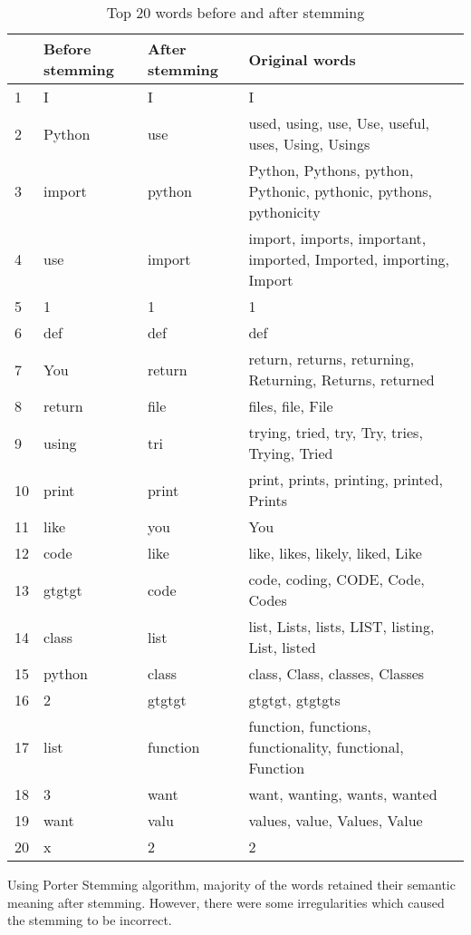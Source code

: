 \begin{table}
\caption{Top 20 words before and after stemming}\label{stem}
\begin{tabu}{X[1,l]X[4,l]|X[4,l]X[10,l]}
    \textbf{} & \textbf{Before stemming} &
    \textbf{After stemming} & \textbf{Original words} \\
     & I & I & I \\
    2 & Python & use &
    used, using, use, Use, useful, uses, Using, Usings \\
    3 & import & python &
    Python, Pythons, python, Pythonic, pythonic, pythons, pythonicity \\
    4 & use & import &
    import, imports, important, imported, Imported, importing, Import \\
    5 & 1 & 1 & 1 \\
    6 & def & def & def \\
    7 & You & return & 
    return, returns, returning, Returning, Returns, returned \\
    8 & return & file &
    files, file, File \\
    9 & using & tri &
    trying, tried, try, Try, tries, Trying, Tried \\
    10 & print & print &
    print, prints, printing, printed, Prints \\
    11 & like & you & You \\
    12 & code & like & 
    like, likes, likely, liked, Like \\
    13 & gtgtgt & code &
    code, coding, CODE, Code, Codes \\
    14 & class & list &
    list, Lists, lists, LIST, listing, List, listed \\
    15 & python & class &
    class, Class, classes, Classes \\
    16 & 2 & gtgtgt &
    gtgtgt, gtgtgts \\
    17 & list & function &
    function, functions, functionality, functional, Function \\
    18 & 3 & want &
    want, wanting, wants, wanted \\
    19 & want & valu &
    values, value, Values, Value \\
    20 & x & 2 & 2
\end{tabu} 
\end{table}

Using Porter Stemming algorithm, majority of the words retained their
semantic meaning after stemming. However, there were some irregularities
which caused the stemming to be incorrect.

